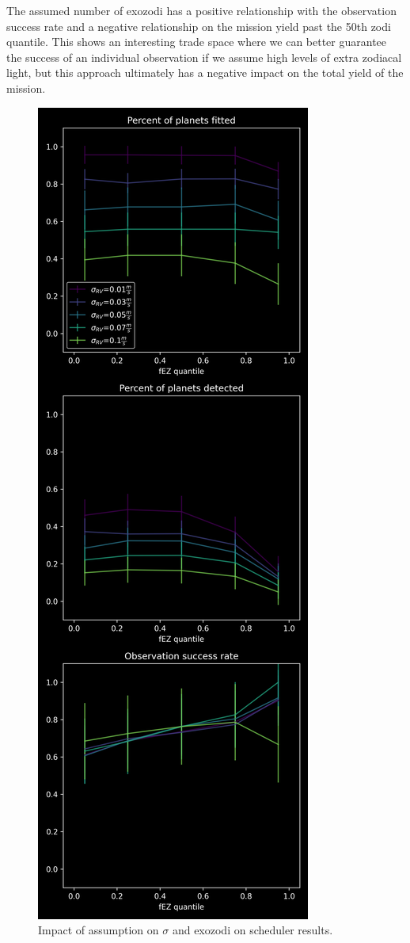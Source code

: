 The assumed number of exozodi has a positive relationship with the observation
success rate and a negative relationship on the mission yield past the 50th
zodi quantile. This shows an interesting trade space where we can better
guarantee the success of an individual observation if we assume high levels of
extra zodiacal light, but this approach ultimately has a negative impact on the
total yield of the mission.

\begin{figure}
  \begin{center}
    \includegraphics[height=0.9\textheight]{ch4/figures/fEZ_impact.png}
  \end{center}
  \caption{
    Impact of assumption on $\sigma$ and exozodi on scheduler results.
  }
  \label{fig:sigma_nEZ_impact_plots}
\end{figure}

